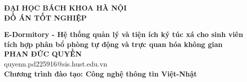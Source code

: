 \documentclass[DoAn.tex]{subfiles}
\begin{document}
\begin{titlepage}
\thispagestyle{empty}
\begin{center}

{\textbf{\large{ĐẠI HỌC BÁCH KHOA HÀ NỘI}}}\\[4cm]

{\textbf{\huge{ĐỒ ÁN TỐT NGHIỆP}}}\\[1cm]
{\textbf{\Large{E-Dormitory - Hệ thống quản lý và tiện ích ký túc xá cho sinh viên
tích hợp phân bổ phòng tự động và trực quan hóa không gian}}\\[1cm]

{\textbf{\large{PHAN ĐỨC QUYỀN}}}\\
{\large{quyenn.pd225916@sis.hust.edu.vn}}\\[0.5cm]

{\textbf{\large{Chương trình đào tạo: Công nghệ thông tin Việt-Nhật}}}\\

\vspace{4cm}
\begin{table}[H]
\centering
{}
\end{table}}
\end{center}

\end{titlepage}
\end{document}
